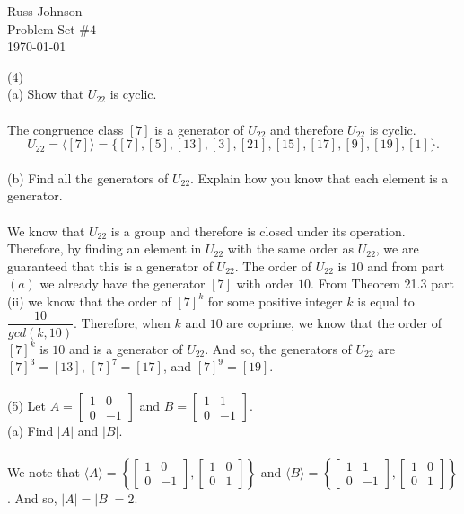 \documentclass[11pt,a4paper]{article}
\begin{document}
\begin{flushright}
Russ Johnson\\
Problem Set $\#4$\\
\today\\
\end{flushright}

(4)\\
{ (a)} Show that $U_{22}$ is cyclic.\\
~\\
The congruence class $[7]$ is a generator of $U_{22}$ and therefore $U_{22}$ is cyclic.
\[U_{22} = \langle [7] \rangle = \{[7], [5],[13],[3],[21],[15],[17],[9],[19],[1]\}.\]
~\\
(b) Find all the generators of $U_{22}$. Explain how you know that each element is a generator.\\
~\\
We know that $U_{22}$ is a group and therefore is closed under its operation. Therefore, by finding an element in $U_{22}$ with the same order as $U_{22}$, we are guaranteed that this is a generator of $U_{22}$. The order of $U_{22}$ is $10$ and from part $(a)$ we already have the generator $[7]$ with order $10$. From Theorem 21.3 part (ii) we know that the order of $[7]^k$ for some positive integer $k$ is equal to $\dfrac{10}{gcd(k,10)}$. Therefore, when $k$ and $10$ are coprime, we know that the order of $[7]^k$ is $10$ and is a generator of $U_{22}$. And so, the generators of $U_{22}$ are $[7]^3 = [13]$, $[7]^7 = [17]$, and $[7]^9 = [19]$.\\
~\\
{(5)} Let $A = \begin{bmatrix}1&0\\0&-1\end{bmatrix} $ and $B = \begin{bmatrix}1&1\\0&-1\end{bmatrix}$.\\
{(a)} Find $|A|$ and $|B|$.\\
~\\
We note that $\langle A \rangle =\left\{ \begin{bmatrix}1&0\\0&-1\end{bmatrix}, \begin{bmatrix}1&0\\0&1\end{bmatrix} \right\}$ and  $\langle B \rangle = \left\{ \begin{bmatrix}1&1\\0&-1\end{bmatrix}, \begin{bmatrix}1&0\\0&1\end{bmatrix} \right\}$. And so, $|A| = |B| = 2$.
\end{document}
